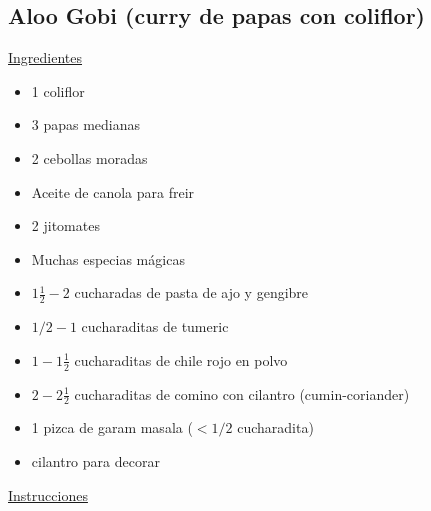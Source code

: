 \subsection{Aloo Gobi (curry de papas con coliflor)}
\underline{Ingredientes}
\begin{itemize}
\item 1 coliflor
\item 3 papas medianas
\item 2 cebollas moradas
\item Aceite de canola para freir
\item 2 jitomates
\item Muchas especias m\'agicas
\item $1 \frac{1}{2} - 2$ cucharadas de pasta de ajo y gengibre
\item $1/2 - 1$ cucharaditas de tumeric
\item $1 - 1 \frac{1}{2}$ cucharaditas de chile rojo en polvo
\item $2 - 2 \frac{1}{2}$ cucharaditas de comino con cilantro (cumin-coriander)
\item 1 pizca de garam masala ($< 1/2$ cucharadita)
\item cilantro para decorar

\end{itemize}

\underline{Instrucciones}

